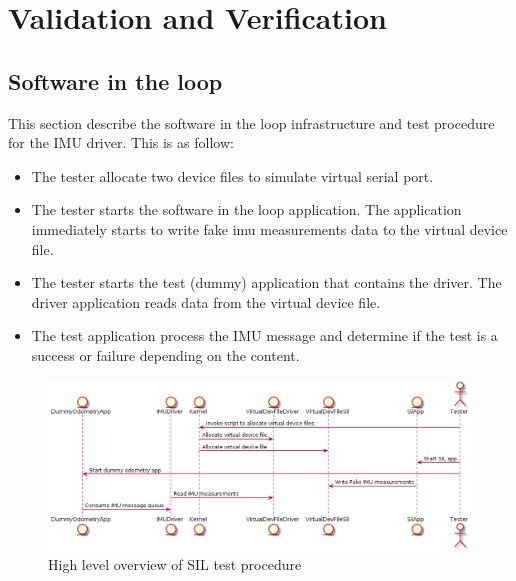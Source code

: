 \section{Validation and Verification}
\subsection{Software in the loop}
This section describe the software in the loop infrastructure and test procedure for the IMU driver. This is as follow:
\begin{itemize}
    \item The tester allocate two device files to simulate virtual serial port.
    \item The tester starts the software in the loop application. The application immediately starts to write fake imu measurements data to the virtual device file.
    \item The tester starts the test (dummy) application that contains the driver. The driver application reads data from the virtual device file.
    \item The test application process the IMU message and determine if the test is a success or failure depending on the content.
\end{itemize}



\begin{figure}[ht]
    \centering
    \includegraphics[width=0.75 \textwidth]{diagrams/software_in_the_loop.png}
    \caption{High level overview of SIL test procedure}
    \label{reference}
\end{figure}

